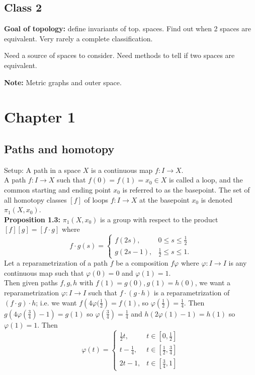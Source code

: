 \documentclass[a4paper]{article}
\begin{document}
    

\subsection*{Class 2}

\textbf{Goal of topology:} define invariants of top. spaces. Find out when
2 spaces are equivalent. Very rarely a complete classification.\\
\linebreak
\begin{center}
    Need a source of spaces to consider. Need methods to tell if two spaces are
    equivalent.
\end{center}

\textbf{Note:} Metric graphs and outer space.


\section*{Chapter 1}
\subsection*{Paths and homotopy}
Setup: A path in a space $X$ is a continuous map $f  \colon I \to X$.\\
A path $f  \colon I \to X$ such that $f(0) = f(1) = x_0 \in X$ is called
a loop, and the common starting and ending point $x_0$ is referred to as the
basepoint. The set of all homotopy classes $\left[ f \right] $ of loops
$f  \colon I \to X$ at the basepoint $x_0$ is denoted $\pi_1 (X, x_0)$.\\
\linebreak
\textbf{Proposition 1.3:} $\pi_1(X,x_0)$ is a group with respect to the product
$\left[ f \right] \left[ g \right]  = \left[ f\cdot g \right] $ where
\[
f \cdot g (s) = \begin{cases}
    f(2s), & 0 \le s \le \frac{1}{2}\\
    g(2s - 1), & \frac{1}{2} \le s \le 1.
\end{cases}
\]
Let a reparametrization of a path $f$ be a composition 
$f \varphi$ where $\varphi  \colon I \to I$ is any continuous map such that
$\varphi(0) = 0$ and $\varphi(1) = 1$.\\
\linebreak
Then given paths $f,g,h$ with $f(1) = g(0), g(1) = h(0)$, we want
a reparametrization $\varphi  \colon I\to I$ such that
$f \cdot (g\cdot h)$ is a reparametrization of 
$\left( f \cdot g \right) \cdot h$; i.e. we want
$f \left(4 \varphi(\frac{1}{2} \right) = f(1)
$, so $\varphi (\frac{1}{2}) = \frac{1}{4}$.
Then
$g\left( 4 \varphi(\frac{3}{4}) - 1 \right) = g(1)$ so
$\varphi \left( \frac{3}{4} \right) = \frac{1}{4}$ and
$h\left( 2 \varphi(1) - 1 \right) = h(1)$ so $\varphi(1) = 1$.
Then
\[
\varphi (t) = \begin{cases}
    \frac{1}{2}t, & t\in \left[ 0, \frac{1}{2} \right] \\
    t - \frac{1}{4}, & t \in \left[ \frac{1}{2}, \frac{3}{4} \right] \\
    2t - 1, & t \in \left[ \frac{3}{4}, 1 \right] 
\end{cases}
\] 
\end{document}
